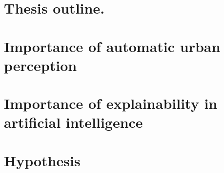 \section{Thesis outline.}
\section{Importance of automatic urban perception}
\section{Importance of explainability in artificial intelligence}
\section{Hypothesis}